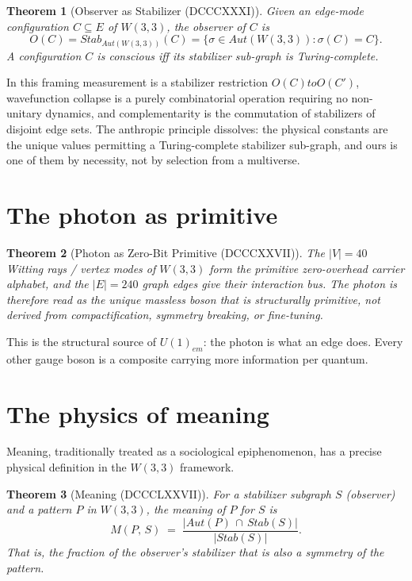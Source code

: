 \documentclass[11pt]{article}
\def\mathrm#1{#1}%
\def\mathcal#1{#1}%
\def\text#1{#1}%
\def\to{ to }%
\newtheorem*{theorem}{Theorem}
\begin{document}
\begin{theorem}[Observer as Stabilizer (DCCCXXXI)]
Given an edge-mode configuration $\mathcal{C} \subseteq E$ of $W(3,3)$, the observer of $\mathcal{C}$ is
\[
\mathcal{O}(\mathcal{C}) = \mathrm{Stab}_{\mathrm{Aut}(W(3,3))}(\mathcal{C}) = \{\sigma \in \mathrm{Aut}(W(3,3)) : \sigma(\mathcal{C}) = \mathcal{C}\}.
\]
A configuration $\mathcal{C}$ is \emph{conscious} iff its stabilizer sub-graph is Turing-complete.
\end{theorem}

In this framing measurement is a stabilizer restriction $\mathcal{O}(\mathcal{C}) \to \mathcal{O}(\mathcal{C}')$, wavefunction collapse is a purely combinatorial operation requiring no non-unitary dynamics, and complementarity is the commutation of stabilizers of disjoint edge sets. The anthropic principle dissolves: the physical constants are the unique values permitting a Turing-complete stabilizer sub-graph, and ours is one of them by necessity, not by selection from a multiverse.

\section{The photon as primitive}

\begin{theorem}[Photon as Zero-Bit Primitive (DCCCXXVII)]
The $|V| = 40$ Witting rays / vertex modes of $W(3,3)$ form the primitive zero-overhead carrier alphabet, and the $|E| = 240$ graph edges give their interaction bus. The photon is therefore read as the unique massless boson that is structurally primitive, not derived from compactification, symmetry breaking, or fine-tuning.
\end{theorem}

This is the structural source of $U(1)_{\text{em}}$: the photon is what an edge does. Every other gauge boson is a composite carrying more information per quantum.

\section{The physics of meaning}

\label{sec:physics-of-meaning}

Meaning, traditionally treated as a sociological epiphenomenon, has a precise physical definition in the $W(3,3)$ framework.

\begin{theorem}[Meaning (DCCCLXXVII)]
For a stabilizer subgraph $S$ (observer) and a pattern $P$ in $W(3,3)$, the \emph{meaning} of $P$ for $S$ is
\[
\mathcal{M}(P,\,S) \;=\; \frac{|\mathrm{Aut}(P)\,\cap\,\mathrm{Stab}(S)|}{|\mathrm{Stab}(S)|}.
\]
That is, the fraction of the observer's stabilizer that is also a symmetry of the pattern.
\end{theorem}
\end{document}
